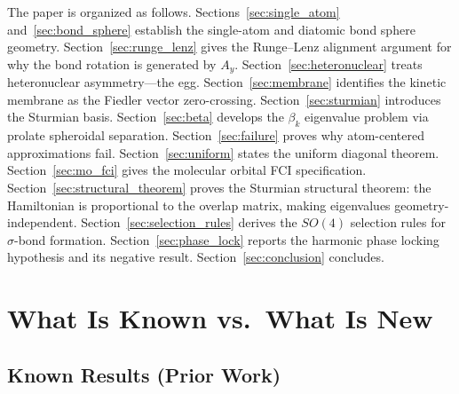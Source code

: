 \documentclass[aps,pra,twocolumn,superscriptaddress,longbibliography]{revtex4-2}
\begin{document}
The paper is organized as follows.  Sections~\ref{sec:single_atom}
and~\ref{sec:bond_sphere} establish the single-atom and diatomic bond
sphere geometry.  Section~\ref{sec:runge_lenz} gives the Runge--Lenz
alignment argument for why the bond rotation is generated by $A_y$.
Section~\ref{sec:heteronuclear} treats heteronuclear asymmetry---the
egg.  Section~\ref{sec:membrane} identifies the kinetic membrane as
the Fiedler vector zero-crossing.  Section~\ref{sec:sturmian} introduces
the Sturmian basis.  Section~\ref{sec:beta} develops the $\beta_k$
eigenvalue problem via prolate spheroidal separation.
Section~\ref{sec:failure} proves why atom-centered approximations fail.
Section~\ref{sec:uniform} states the uniform diagonal theorem.
Section~\ref{sec:mo_fci} gives the molecular orbital FCI specification.
Section~\ref{sec:structural_theorem} proves the Sturmian structural
theorem: the Hamiltonian is proportional to the overlap matrix, making
eigenvalues geometry-independent.
Section~\ref{sec:selection_rules} derives the $SO(4)$ selection rules
for $\sigma$-bond formation.
Section~\ref{sec:phase_lock} reports the harmonic phase locking
hypothesis and its negative result.
Section~\ref{sec:conclusion} concludes.


\section{What Is Known vs.\ What Is New}
\label{sec:attribution}

\subsection{Known Results (Prior Work)}
\end{document}
